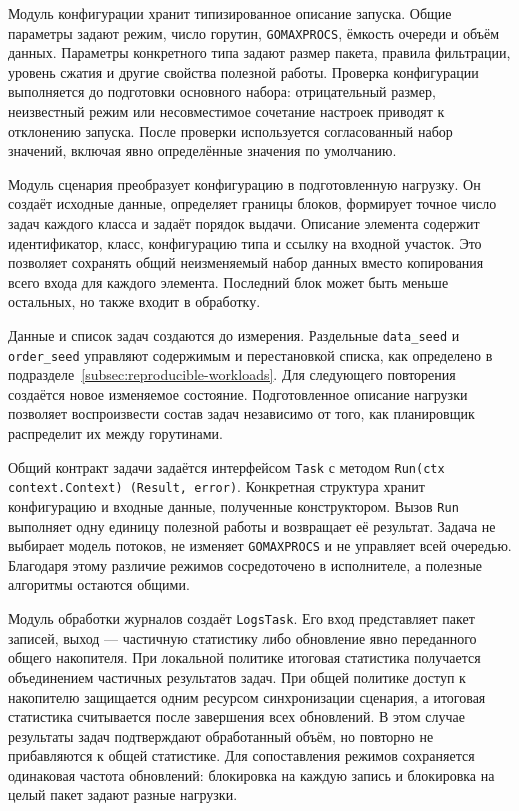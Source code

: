 Модуль конфигурации хранит типизированное описание запуска. Общие параметры задают режим,
  число горутин, \texttt{GOMAXPROCS}, ёмкость очереди и объём данных. Параметры конкретного
  типа задают размер пакета, правила фильтрации, уровень сжатия и другие свойства полезной работы.
  Проверка конфигурации выполняется до подготовки основного набора: отрицательный размер,
  неизвестный режим или несовместимое сочетание настроек приводят к отклонению запуска.
  После проверки используется согласованный набор значений, включая явно определённые значения
  по умолчанию.

Модуль сценария преобразует конфигурацию в подготовленную нагрузку. Он создаёт исходные данные,
  определяет границы блоков, формирует точное число задач каждого класса и задаёт порядок выдачи.
  Описание элемента содержит идентификатор, класс, конфигурацию типа и ссылку на входной участок.
  Это позволяет сохранять общий неизменяемый набор данных вместо копирования всего входа
  для каждого элемента. Последний блок может быть меньше остальных, но также входит в обработку.

Данные и список задач создаются до измерения. Раздельные \texttt{data\_seed}
  и \texttt{order\_seed} управляют содержимым и перестановкой списка, как определено
  в подразделе~\ref{subsec:reproducible-workloads}. Для следующего повторения создаётся
  новое изменяемое состояние. Подготовленное описание нагрузки позволяет воспроизвести состав
  задач независимо от того, как планировщик распределит их между горутинами.

Общий контракт задачи задаётся интерфейсом \texttt{Task} с методом
  \texttt{Run(ctx context.Context) (Result, error)}. Конкретная структура хранит конфигурацию
  и входные данные, полученные конструктором. Вызов \texttt{Run} выполняет одну единицу полезной
  работы и возвращает её результат. Задача не выбирает модель потоков, не изменяет
  \texttt{GOMAXPROCS} и не управляет всей очередью. Благодаря этому различие режимов сосредоточено
  в исполнителе, а полезные алгоритмы остаются общими.

Модуль обработки журналов создаёт \texttt{LogsTask}. Его вход представляет пакет записей,
  выход — частичную статистику либо обновление явно переданного общего накопителя.
  При локальной политике итоговая статистика получается объединением частичных результатов задач.
  При общей политике доступ к накопителю защищается одним ресурсом синхронизации сценария,
  а итоговая статистика считывается после завершения всех обновлений. В этом случае результаты
  задач подтверждают обработанный объём, но повторно не прибавляются к общей статистике.
  Для сопоставления режимов сохраняется одинаковая частота обновлений: блокировка на каждую запись
  и блокировка на целый пакет задают разные нагрузки.


